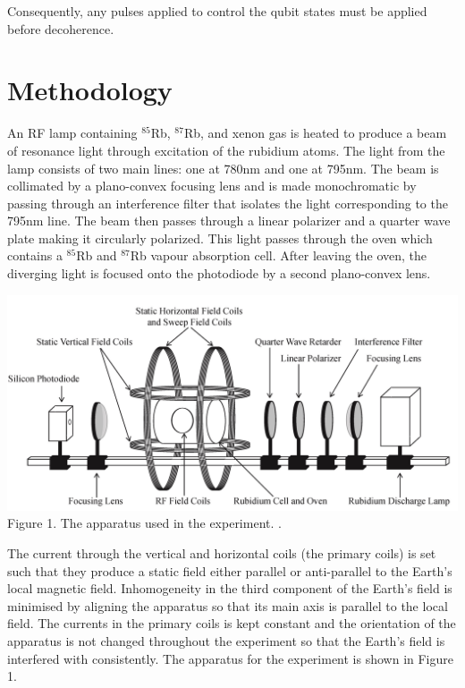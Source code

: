 \documentclass{article}
\begin{document}
\begin{multicols*}{2}
Consequently, any pulses applied to control the qubit states must be applied before decoherence. 


\section{Methodology}

An RF lamp containing $^{85}$Rb, $^{87}$Rb, and xenon gas is heated to produce a beam of resonance light through excitation of the rubidium atoms. The light from the lamp consists of two main lines: one at 780nm and one at 795nm. The beam is collimated by a plano-convex focusing lens and is made monochromatic by passing through an interference filter that isolates the light corresponding to the 795nm line. The beam then passes through a linear polarizer and a quarter wave plate making it circularly polarized. This light passes through the oven which contains a $^{85}$Rb and $^{87}$Rb vapour absorption cell. After leaving the oven, the diverging light is focused onto the photodiode by a second plano-convex lens.
\begin{Figure}
\centering
\includegraphics[width=\linewidth]{apparatus.jpg}
\footnotesize
Figure 1. The apparatus used in the experiment. \cite{apparatus}.
\normalsize
\vspace{5mm} %
\end{Figure}

The current through the vertical and horizontal coils (the primary coils) is set such that they produce a static field either parallel or anti-parallel to the Earth's local magnetic field. Inhomogeneity in the third component of the Earth's field is minimised by aligning the apparatus so that its main axis is parallel to the local field. The currents in the primary coils is kept constant and the orientation of the apparatus is not changed throughout the experiment so that the Earth's field is interfered with consistently. The apparatus for the experiment is shown in Figure 1.


\end{multicols*}
\end{document}
